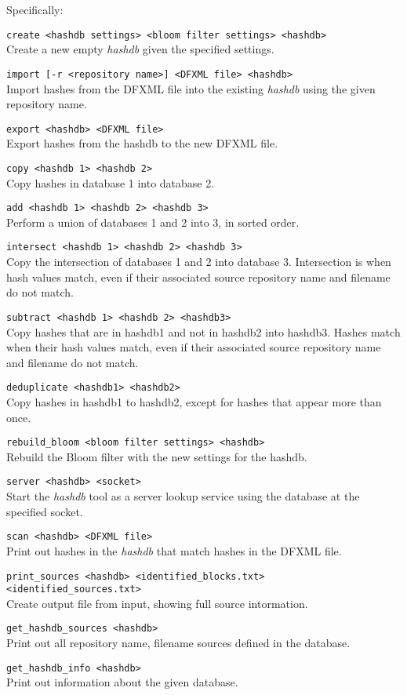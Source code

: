 \documentclass[12pt,twoside]{article}
\newcommand{\hdb}{\emph{hashdb}\xspace}
\begin{document}
Specifically:
\begin{compactitem}
\item \texttt{create <hashdb settings> <bloom filter settings> <hashdb>} \\
Create a new empty \hdb given the specified settings.
\item \texttt{import [-r <repository name>] <DFXML file> <hashdb>} \\
Import hashes from the DFXML file into the existing \hdb
using the given repository name.
\item \texttt{export <hashdb> <DFXML file>} \\
Export hashes from the hashdb to the new DFXML file.
\item \texttt{copy <hashdb 1> <hashdb 2>} \\
Copy hashes in database 1 into database 2.
\item \texttt{add <hashdb 1> <hashdb 2> <hashdb 3>} \\
Perform a union of databases 1 and 2 into 3, in sorted order.
\item \texttt{intersect <hashdb 1> <hashdb 2> <hashdb 3>} \\
Copy the intersection of databases 1 and 2 into database 3.
Intersection is when hash values match, even if their associated source
repository name and filename do not match.
\item \texttt{subtract <hashdb 1> <hashdb 2> <hashdb3>} \\
Copy hashes that are in hashdb1 and not in hashdb2 into hashdb3.
Hashes match when their hash values match, even if their associated source
repository name and filename do not match.
\item \texttt{deduplicate <hashdb1> <hashdb2>} \\
Copy hashes in hashdb1 to hashdb2,
except for hashes that appear more than once.
\item \texttt{rebuild\_bloom <bloom filter settings> <hashdb>} \\
Rebuild the Bloom filter with the new settings for the hashdb.
\item \texttt{server <hashdb> <socket>} \\
Start the \hdb tool as a server lookup service using the database
at the specified socket.
\item \texttt{scan <hashdb> <DFXML file>} \\
Print out hashes in the \hdb that match hashes in the DFXML file.
\item \texttt{print\_sources <hashdb> <identified\_blocks.txt> <identified\_sources.txt>} \\
Create output file from input, showing full source intormation.
\item \texttt{get\_hashdb\_sources <hashdb>} \\
Print out all repository name, filename sources defined in the database.
\item \texttt{get\_hashdb\_info <hashdb>} \\
Print out information about the given database.
\end{compactitem}
\end{document}
